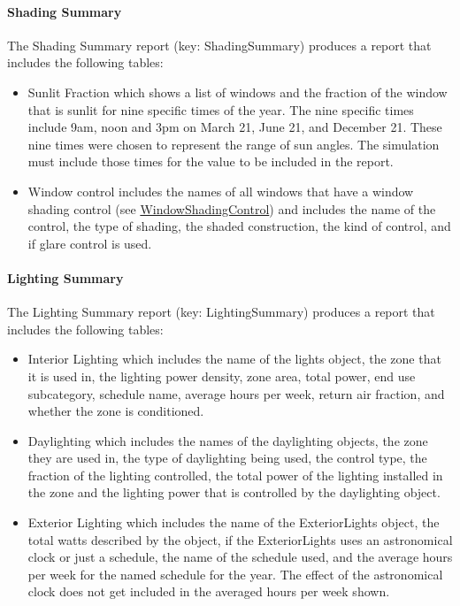 \paragraph{Shading Summary}\label{shading-summary}

The Shading Summary report (key: ShadingSummary) produces a report that includes the following tables:

\begin{itemize}
\item
  Sunlit Fraction which shows a list of windows and the fraction of the window that is sunlit for nine specific times of the year. The nine specific times include 9am, noon and 3pm on March 21, June 21, and December 21. These nine times were chosen to represent the range of sun angles. The simulation must include those times for the value to be included in the report.
\item
  Window control includes the names of all windows that have a window shading control (see \hyperref[windowpropertyshadingcontrol]{WindowShadingControl}) and includes the name of the control, the type of shading, the shaded construction, the kind of control, and if glare control is used.
\end{itemize}

\paragraph{Lighting Summary}\label{lighting-summary}

The Lighting Summary report (key: LightingSummary) produces a report that includes the following tables:

\begin{itemize}
\item
  Interior Lighting which includes the name of the lights object, the zone that it is used in, the lighting power density, zone area, total power, end use subcategory, schedule name, average hours per week, return air fraction, and whether the zone is conditioned.
\item
  Daylighting which includes the names of the daylighting objects, the zone they are used in, the type of daylighting being used, the control type, the fraction of the lighting controlled, the total power of the lighting installed in the zone and the lighting power that is controlled by the daylighting object.
\item
  Exterior Lighting which includes the name of the ExteriorLights object, the total watts described by the object, if the ExteriorLights uses an astronomical clock or just a schedule, the name of the schedule used, and the average hours per week for the named schedule for the year. The effect of the astronomical clock does not get included in the averaged hours per week shown.
\end{itemize}


